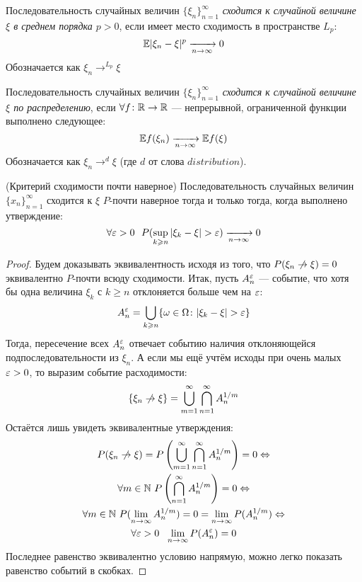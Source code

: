 \begin{definition}
	Последовательность случайных величин $\{\xi_n\}_{n = 1}^\infty$ \textit{сходится к случайной величине $\xi$ в среднем порядка $p > 0$}, если имеет место сходимость в пространстве $L_p$:
	\[
		\mathbb{E}|\xi_n - \xi|^p \xrightarrow[n \to \infty]{} 0
	\]
	Обозначается как $\xi_n \to^{L_p} \xi$
\end{definition}

\begin{definition}
	Последовательность случайных величин $\{\xi_n\}_{n = 1}^\infty$ \textit{сходится к случайной величине $\xi$ по распределению}, если $\forall f \colon \mathbb{R} \to \mathbb{R}$ --- непрерывной, ограниченной функции выполнено следующее:
	\[
		\mathbb{E} f(\xi_n) \xrightarrow[n \to \infty]{
		} \mathbb{E} f(\xi)
	\]
	Обозначается как $\xi_n \to^d \xi$ (где $d$ от слова $distribution$).
\end{definition}

\begin{theorem} (Критерий сходимости почти наверное)
	Последовательность случайных величин $\{x_n\}_{n = 1}^\infty$ сходится к $\xi$ $P$-почти наверное тогда и только тогда, когда выполнено утверждение:
	\[
		\forall \varepsilon > 0\ \ P(\sup_{k \geqslant n} |\xi_k - \xi| > \varepsilon) \xrightarrow[n \to \infty]{} 0
	\]
\end{theorem}

\begin{proof}
	Будем доказывать эквивалентность исходя из того, что $P(\xi_n \centernot\to \xi) = 0$ эквивалентно $P$-почти всюду сходимости. Итак, пусть $A_n^{\varepsilon}$ --- событие, что хотя бы одна величина $\xi_k$ с $k \ge n$ отклоняется больше чем на $\varepsilon$:
	\[
		A_n^{\varepsilon} = \bigcup_{k \geqslant n} \{\omega \in \Omega \colon |\xi_k - \xi| > \varepsilon\}
	\]
	Тогда, пересечение всех $A_n^{\varepsilon}$ отвечает событию наличия отклоняющейся подпоследовательности из $\xi_n$. А если мы ещё учтём исходы при очень малых $\varepsilon > 0$, то выразим событие расходимости:
	\[
		\{\xi_n \centernot\to \xi\} = \bigcup_{m = 1}^\infty \bigcap_{n = 1}^\infty A_n^{1 / m}
	\]
	Остаётся лишь увидеть эквивалентные утверждения:
	\begin{multline*}
		P(\xi_n \centernot\to \xi) = P\ps{\bigcup_{m = 1}^\infty \bigcap_{n = 1}^\infty A_n^{1 / m}} = 0 \Lra
		\\
		\forall m \in \N\  P\ps{\bigcap_{n = 1}^\infty A_n^{1 / m}} = 0 \Lra
		\\
		\forall m \in \N\ P(\lim_{n \to \infty} A_n^{1 / m}) = 0 = \lim_{n \to \infty} P(A_n^{1 / m}) \Lra
		\\
		\forall \eps > 0\ \ \lim_{n \to \infty} P(A_n^\eps) = 0
	\end{multline*}
	Последнее равенство эквивалентно условию напрямую, можно легко показать равенство событий в скобках.
\end{proof}

